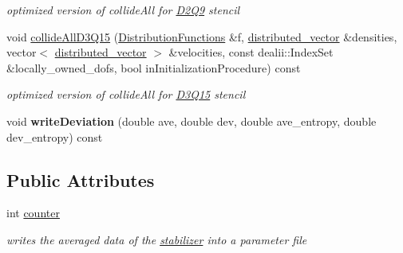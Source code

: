 \begin{DoxyCompactItemize}
\begin{DoxyCompactList}\small\item\em optimized version of collideAll for \hyperlink{classnatrium_1_1D2Q9}{D2Q9} stencil \item\end{DoxyCompactList}\item 
\hypertarget{classnatrium_1_1KBCStandard_a9ce76f9d02120b79a12b883b67268caa}{
void \hyperlink{classnatrium_1_1KBCStandard_a9ce76f9d02120b79a12b883b67268caa}{collideAllD3Q15} (\hyperlink{classnatrium_1_1DistributionFunctions}{DistributionFunctions} \&f, \hyperlink{namespacenatrium_a903d2b92917f582f2ff05f52160ab811}{distributed\_\-vector} \&densities, vector$<$ \hyperlink{namespacenatrium_a903d2b92917f582f2ff05f52160ab811}{distributed\_\-vector} $>$ \&velocities, const dealii::IndexSet \&locally\_\-owned\_\-dofs, bool inInitializationProcedure) const }
\label{classnatrium_1_1KBCStandard_a9ce76f9d02120b79a12b883b67268caa}

\begin{DoxyCompactList}\small\item\em optimized version of collideAll for \hyperlink{classnatrium_1_1D3Q15}{D3Q15} stencil \item\end{DoxyCompactList}\item 
\hypertarget{classnatrium_1_1KBCStandard_a2746649a1c6b4b0cf655b149a3e347dc}{
void {\bfseries writeDeviation} (double ave, double dev, double ave\_\-entropy, double dev\_\-entropy) const }
\label{classnatrium_1_1KBCStandard_a2746649a1c6b4b0cf655b149a3e347dc}

\end{DoxyCompactItemize}
\subsection*{Public Attributes}
\begin{DoxyCompactItemize}
\item 
\hypertarget{classnatrium_1_1KBCStandard_a68610043a08520a41b8c3473ae644ca3}{
int \hyperlink{classnatrium_1_1KBCStandard_a68610043a08520a41b8c3473ae644ca3}{counter}}
\label{classnatrium_1_1KBCStandard_a68610043a08520a41b8c3473ae644ca3}

\begin{DoxyCompactList}\small\item\em writes the averaged data of the \hyperlink{structnatrium_1_1KBCStandard_1_1stabilizer}{stabilizer} into a parameter file \item\end{DoxyCompactList}\end{DoxyCompactItemize}


